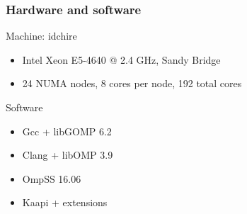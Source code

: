 \documentclass[xcolor={usenames,dvipsnames,svgnames,table}, aspectratio=43]{beamer}
\begin{document}
\begin{frame}
\frametitle{Hardware and software}
\begin{block}{Machine: idchire}
    \begin{itemize}
\item Intel Xeon E5-4640 @ 2.4 GHz, Sandy Bridge
\item 24 NUMA nodes, 8 cores per node, 192 total cores
    \end{itemize}
\end{block}

\begin{block}{Software}
    \begin{itemize}
\item Gcc + libGOMP 6.2
\item Clang + libOMP 3.9
\item OmpSS 16.06
\item Kaapi + extensions

    \end{itemize}
\end{block}








\end{frame}
\end{document}

